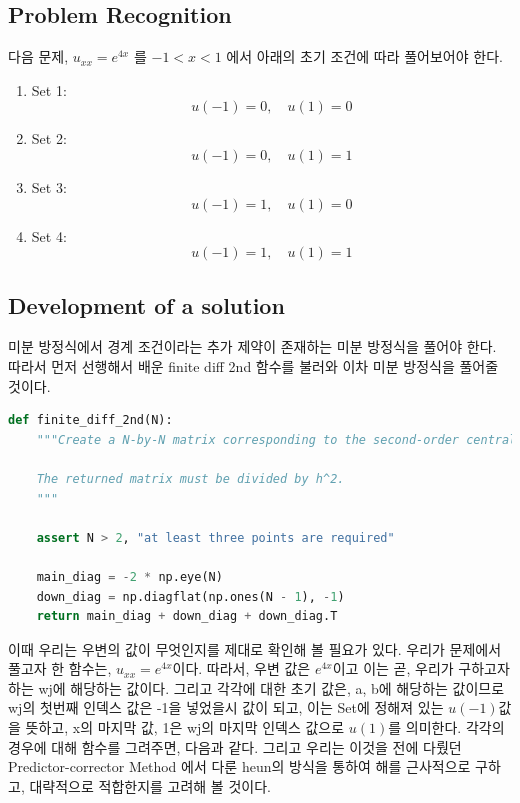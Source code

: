 \documentclass[11pt]{article}
\begin{document}
\subsection{Problem Recognition} 
다음 문제, $u_{xx} = e^{4x}$ 를 $-1 < x < 1$ 에서 아래의 초기 조건에 따라 풀어보어야 한다.
\begin{enumerate}
    \item  Set 1: 
    \begin{equation}
    u(-1) = 0,
    \quad
    u( 1) = 0
        \end{equation}
        \item  Set 2:
            \begin{equation}
            u(-1) = 0
    ,\quad
    u( 1) = 1
                    \end{equation}
            \item  Set 3:
                        \begin{equation}
                        u(-1) = 1
    ,\quad
    u( 1) = 0
                                \end{equation}
                \item  Set 4:
                            \begin{equation}
                            u(-1) = 1
    ,\quad
    u( 1) = 1
                                    \end{equation}
    
\end{enumerate}
\subsection{Development of a solution} 
미분 방정식에서 경계 조건이라는 추가 제약이 존재하는 미분 방정식을 풀어야 한다. 따라서 먼저 선행해서 배운 finite diff 2nd 함수를 불러와 이차 미분 방정식을 풀어줄 것이다. 
\begin{lstlisting}[language=Python]
def finite_diff_2nd(N):
    """Create a N-by-N matrix corresponding to the second-order central difference formula.
    
    The returned matrix must be divided by h^2.
    """
    
    assert N > 2, "at least three points are required"
    
    main_diag = -2 * np.eye(N)
    down_diag = np.diagflat(np.ones(N - 1), -1)
    return main_diag + down_diag + down_diag.T
    \end{lstlisting}
이때 우리는 우변의 값이 무엇인지를 제대로 확인해 볼 필요가 있다. 우리가 문제에서 풀고자 한 함수는, $u_{xx} = e^{4x}$이다. 따라서, 우변 값은 $e^{4x}$이고 이는 곧, 우리가 구하고자 하는 wj에 해당하는 값이다. 그리고 각각에 대한 초기 값은, a, b에 해당하는 값이므로 wj의 첫번째 인덱스 값은 -1을 넣었을시 값이 되고, 이는 Set에 정해져 있는 $u(-1)$값을 뜻하고, x의 마지막 값, 1은 wj의 마지막 인덱스 값으로 $u(1)$를 의미한다. 각각의 경우에 대해 함수를 그려주면, 다음과 같다. 그리고 우리는 이것을 전에 다뤘던 Predictor-corrector Method 에서 다룬 heun의 방식을 통하여 해를 근사적으로 구하고, 대략적으로 적합한지를 고려해 볼 것이다.
\end{document}

